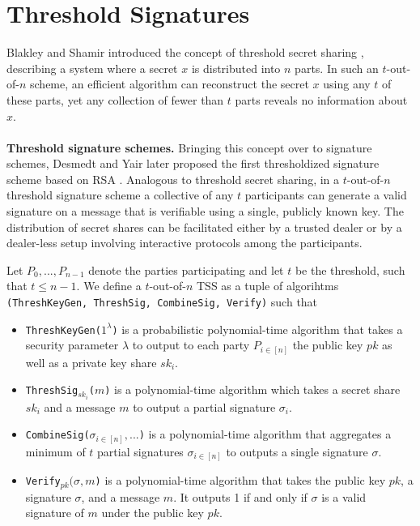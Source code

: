 \section{Threshold Signatures}
\label{prelim:thresholdSignatures}
Blakley and Shamir introduced the concept of threshold secret sharing \cite{blakley1979safeguarding}\cite{shamir1979share}, describing a system where a secret \(x\) is distributed into \(n\) parts. In such an \(t\)-out-of-\(n\) scheme, an efficient algorithm can reconstruct the secret \(x\) using any \(t\) of these parts, yet any collection of fewer than \(t\) parts reveals no information about \(x\).
\\\\
\textbf{Threshold signature schemes.} Bringing this concept over to signature schemes, Desmedt and Yair later proposed the first thresholdized signature scheme based on RSA \cite{desmedt1991shared}. Analogous to threshold secret sharing, in a $t$-out-of-$n$ threshold signature scheme a collective of any $t$ participants can generate a valid signature on a message that is verifiable using a single, publicly known key. The distribution of secret shares can be facilitated either by a trusted dealer or by a dealer-less setup involving interactive protocols among the participants.

\begin{definition}
    Let $P_0,...,P_{n-1}$ denote the parties participating and let $t$ be the threshold, such that $t \leq n-1$. We define a $t$-out-of-$n$ TSS as a tuple of algorihtms \texttt{\textup{(ThreshKeyGen, ThreshSig, CombineSig, Verify)}} such that
    \begin{itemize}
        \item \texttt{\textup{ThreshKeyGen($1^\lambda$)}} is a probabilistic polynomial-time algorithm that takes a security parameter $\lambda$ to output to each party $P_{i\in [n]}$ the public key $pk$ as well as a private key share $sk_i$.
        \item \texttt{\textup{ThreshSig$_{sk_i}$($m$)}} is a polynomial-time algorithm which takes a secret share $sk_i$ and a message $m$ to output a partial signature $\sigma_i$.
        \item \texttt{\textup{CombineSig($\sigma_{i \in [n]},...$)}} is a polynomial-time algorithm that aggregates a minimum of $t$ partial signatures $\sigma_{i \in [n]}$ to outputs a single signature $\sigma$.
        \item \texttt{\textup{Verify$_{pk}(\sigma, m$)}} is a polynomial-time algorithm that takes the public key $pk$, a signature $\sigma$, and a message $m$. It outputs 1 if and only if $\sigma$ is a valid signature of $m$ under the public key $pk$.
    \end{itemize}
\end{definition}


